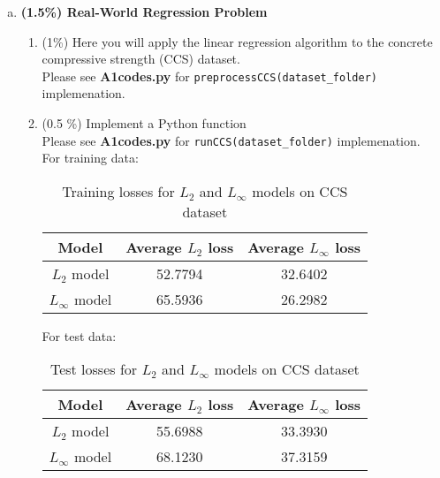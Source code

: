 \documentclass[12pt]{article}
\newcounter{ques}
\newenvironment{question}{\stepcounter{ques}{\noindent\bf Question \arabic{ques}:}}{\vspace{5mm}}
\begin{document}
\begin{question}
\begin{enumerate}[(a)]
\begin{enumerate}[(c.1)]
    \end{enumerate}
    \item \textbf{(1.5\%) Real-World Regression Problem}
      \begin{enumerate}[(d.1)]
        \item (1\%) Here you will apply the linear regression algorithm to the concrete compressive strength (CCS) dataset. \\
        Please see \textbf{A1codes.py} for \texttt{preprocessCCS(dataset\_folder)} implemenation.
        \item (0.5 \%) Implement a Python function \\
        Please see \textbf{A1codes.py} for \texttt{runCCS(dataset\_folder)} implemenation. \\
        For training data:
        \begin{table}[H]
          \centering
          \begin{tabular}{|c|c|c|}
            \hline
            Model & Average $L_2$ loss & Average $L_\infty$ loss \\ 
            \hline
            $L_2$ model & 52.7794 & 32.6402 \\ 
            $L_\infty$ model & 65.5936 & 26.2982 \\ 
            \hline
          \end{tabular}
          \caption{Training losses for $L_2$ and $L_\infty$ models on CCS dataset}
          \label{tab:ccs_train}
        \end{table}

        For test data:
        \begin{table}[H]
          \centering
          \begin{tabular}{|c|c|c|}
            \hline
            Model & Average $L_2$ loss & Average $L_\infty$ loss \\ 
            \hline
            $L_2$ model & 55.6988 & 33.3930 \\ 
            $L_\infty$ model & 68.1230 & 37.3159 \\ 
            \hline
          \end{tabular}
          \caption{Test losses for $L_2$ and $L_\infty$ models on CCS dataset}
          \label{tab:ccs_test}
        \end{table}

      \end{enumerate}
  \end{enumerate}
\end{question}
\end{document}
